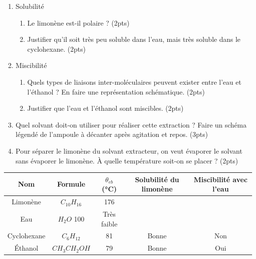 \documentclass[a4paper,fontsize=12pt,fleqn]{scrartcl}%
\begin{document}
\begin{enumerate}
    \item Solubilité \begin{enumerate}
        \item Le limonène est-il polaire ? (2pts)
        \item Justifier qu'il soit très peu soluble dans l'eau, mais très soluble dans le cyclohexane. (2pts)
    \end{enumerate}
    \item Miscibilité \begin{enumerate}
        \item Quels types de liaisons inter-moléculaires peuvent exister entre l'eau et l'éthanol ? En faire une représentation schématique. (2pts)
        \item Justifier que l'eau et l'éthanol sont miscibles. (2pts)
    \end{enumerate}
    \item Quel solvant doit-on utiliser pour réaliser cette extraction ? Faire un schéma légendé de l'ampoule à décanter après agitation et repos. (3pts)
    \item Pour séparer le limonène du solvant extracteur, on veut évaporer le solvant sans évaporer le limonène. À quelle température soit-on se placer ? (2pts)
\end{enumerate}
\begin{table}[h!]
    \centering 
    \begin{tabular}{|c|c|c|c|c|}
        \hline
        \textbf{Nom} & \textbf{Formule} & $\theta_{eb}$ (\unit{\celsius}) & \textbf{Solubilité du limonène} & \textbf{Miscibilité avec l'eau}\\
        \hline
        Limonène & $C_{10}H_{16}$ & 176 & & \\
        \hline
        Eau & $H_2O$ 100 & Très faible & & \\
        \hline
        Cyclohexane & $C_6H_{12}$ & 81 & Bonne & Non \\
        \hline
        Éthanol & $CH_3CH_2OH$ & 79 & Bonne & Oui \\
        \hline
    \end{tabular}
\end{table}
\end{document}
